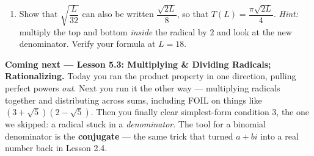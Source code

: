 \documentclass[10pt]{article}
\begin{document}
\begin{extensionbox}
\begin{enumerate}[label=(\alph*), leftmargin=1.8em, itemsep=5pt]
        one. She reasons, ``I will just double the length.'' Why is she wrong, and what should she
        do instead? 
  \item Show that $\sqrt{\dfrac{L}{32}}$ can also be written $\dfrac{\sqrt{2L}}{8}$, so that
        $T(L)=\dfrac{\pi\sqrt{2L}}{4}$. \emph{Hint:} multiply the top and bottom \emph{inside} the
        radical by $2$ and look at the new denominator. Verify your formula at $L=18$.
\end{enumerate}
\end{extensionbox}

\begin{spiralbox}
\textbf{Coming next --- Lesson 5.3: Multiplying \& Dividing Radicals; Rationalizing.} Today you ran
the product property in one direction, pulling perfect powers \emph{out}. Next you run it the other
way --- multiplying radicals together and distributing across sums, including FOIL on things like
$\left(3+\sqrt5\right)\left(2-\sqrt5\right)$. Then you finally clear simplest-form condition 3, the
one we skipped: a radical stuck in a \emph{denominator}. The tool for a binomial denominator is the
\textbf{conjugate} --- the same trick that turned $a+bi$ into a real number back in Lesson 2.4.
\end{spiralbox}
\end{document}
